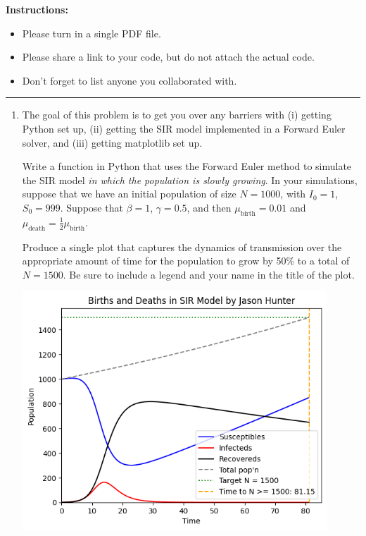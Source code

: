 \documentclass[11pt]{article}
\begin{document}
\renewcommand{\headrulewidth}{0.4pt}

{\bf Instructions:} 
\begin{itemize}[itemsep=-7pt]
	\item Please turn in a single PDF file.
	\item Please share a link to your code, but do not attach the actual code. 
	\item Don't forget to list anyone you collaborated with. 
\end{itemize}
\vspace{0.1in}\hrule

\begin{enumerate}

\item The goal of this problem is to get you over any barriers with 
	  (i) getting Python set up, 
	  (ii) getting the SIR model implemented in a Forward Euler solver, and
	  (iii) getting matplotlib set up.

Write a function in Python that uses the Forward Euler method to simulate the SIR model {\it
in which the population is slowly growing}.
In your simulations, suppose that we have an initial population of size $N=1000$, with $I_0=1$, $S_0=999$.
Suppose that
$\beta=1$, $\gamma=0.5$,
and then
$\mu_{\text{birth}}=0.01$
and
$\mu_{\text{death}} = \tfrac{1}{2} \mu_\text{birth}$.


Produce a single plot that captures the dynamics of transmission over the appropriate amount of time
for the population to grow by 50\% to a total of $N=1500$.
Be sure to include a legend and your name in the title of the plot.

\begin{center}
  \includegraphics[width=0.9\textwidth, height=0.6\textheight, keepaspectratio]{births-and-deaths.png}
\end{center}


\end{enumerate}
\end{document}
